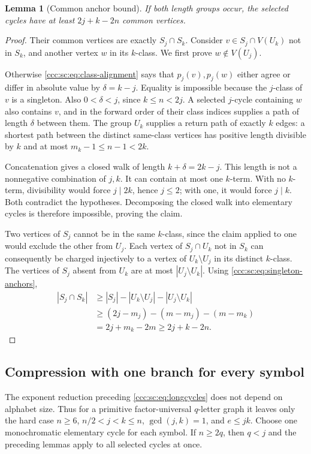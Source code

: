 \documentclass[11pt,letterpaper]{article}
\newtheorem{lemma}[theorem]{Lemma}
\theoremstyle{definition}
\theoremstyle{remark}
\begin{document}
\begin{lemma}[Common anchor bound]\label{ccc:sc:lem:common-anchors}
If both length groups occur, the selected cycles have at least $2j+k-2n$ common vertices.
\end{lemma}
\begin{proof}
Their common vertices are exactly $S_j\cap S_k$. Consider $v\in S_j\cap V(U_k)$ not in $S_k$, and another vertex $w$ in its $k$-class. We first prove $w\notin V(U_j)$.

Otherwise \eqref{ccc:sc:eq:class-alignment} says that $p_j(v),p_j(w)$ either agree or differ in absolute value by $\delta=k-j$. Equality is impossible because the $j$-class of $v$ is a singleton. Also $0<\delta<j$, since $k\le n<2j$. A selected $j$-cycle containing $w$ also contains $v$, and in the forward order of their class indices supplies a path of length $\delta$ between them. The group $U_k$ supplies a return path of exactly $k$ edges: a shortest path between the distinct same-class vertices has positive length divisible by $k$ and at most $m_k-1\le n-1<2k$.

Concatenation gives a closed walk of length $k+\delta=2k-j$. This length is not a nonnegative combination of $j,k$. It can contain at most one $k$-term. With no $k$-term, divisibility would force $j\mid2k$, hence $j\le2$; with one, it would force $j\mid k$. Both contradict the hypotheses. Decomposing the closed walk into elementary cycles is therefore impossible, proving the claim.

Two vertices of $S_j$ cannot be in the same $k$-class, since the claim applied to one would exclude the other from $U_j$. Each vertex of $S_j\cap U_k$ not in $S_k$ can consequently be charged injectively to a vertex of $U_k\setminus U_j$ in its distinct $k$-class. The vertices of $S_j$ absent from $U_k$ are at most $|U_j\setminus U_k|$. Using \eqref{ccc:sc:eq:singleton-anchors},
\begin{align*}
 |S_j\cap S_k|
 &\ge |S_j|-|U_k\setminus U_j|-|U_j\setminus U_k|\\
 &\ge(2j-m_j)-(m-m_j)-(m-m_k)\\
 &=2j+m_k-2m\ge2j+k-2n.
\end{align*}
\end{proof}

\subsection{Compression with one branch for every symbol}

The exponent reduction preceding \eqref{ccc:sc:eq:longcycles} does not depend on alphabet size. Thus for a primitive factor-universal $q$-letter graph it leaves only the hard case $n\ge6$, $n/2<j<k\le n$, $\gcd(j,k)=1$, and $e\le jk$. Choose one monochromatic elementary cycle for each symbol. If $n\ge2q$, then $q<j$ and the preceding lemmas apply to all selected cycles at once.
\end{document}
